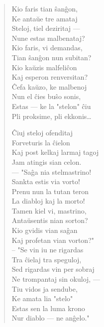 \begin{verse}
\asterism{}

                        Kio faris tian \^san\^gon,\\
                        Ke anta\u ue tre amataj\\
                        Steloj, tiel deziritaj ---\\
                        Nune estas malbenataj?\\
                        Kio faris, vi demandas,\\
                        Tian \^san\^gon nun subitan?\\
                        Kio ka\u uzis malfeli\^con\\
                        Kaj esperon renversitan?\\
                        \^Cefa ka\u uzo, ke malbenoj\\
                        Nun el \^cies bu\^so sonis,\\
                        Estas --- ke la "stelon" \^ciu\\
                        Pli proksime, pli ekkonis\dots

\asterism{}
\newpage
                        \^Ciuj steloj ofenditaj\\
                        Forveturis la \^cielon\\
                        Kaj post kelkaj larmaj tagoj\\
                        Jam atingis sian celon.\\
                        --- "Sa\^ga nia stelmastrino!\\
                        Sankta estis via vorto!\\
                        Prenu nun la tutan teron\\
                        La diabloj kaj la morto!\\
                        Tamen kiel vi, mastrino,\\
                        Anta\u usentis nian sorton?\\
                        Kio gvidis vian sa\^gan\\
                        Kaj profetan vian vorton?"\\
                        -- "Se vin iu ne rigardas\\
                        Tra \^cielaj tra speguloj,\\
                        Sed rigardas vin per sobraj\\
                        Ne trompantaj sin okuloj, ---\\
                        Tiu vidos ja sendube,\\
                        Ke amata lia "stelo"\\
                        Estas sen la luma krono\\
                        Nur diablo --- ne an\^gelo."

\end{verse}

\smallrule{}
